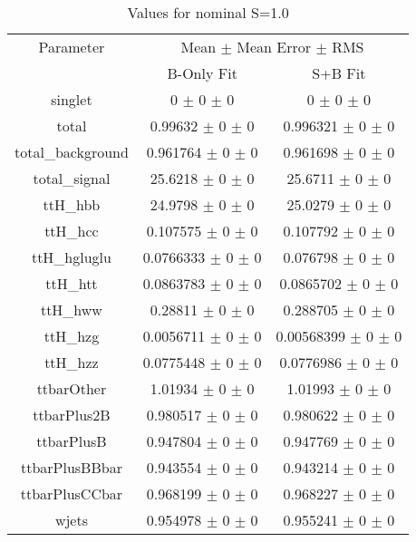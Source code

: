 \begin{table}
\centering
\caption{Values for nominal S=1.0}
\begin{tabular}{ccc}
\toprule
Parameter 	& \multicolumn{2}{c}{Mean $\pm$ Mean Error $\pm$ RMS}\\
 	& B-Only Fit & S+B Fit\\
\midrule
singlet 	& \num{0} $\pm$ \num{0} $\pm$ \num{0} 	& \num{0} $\pm$ \num{0} $\pm$ \num{0}\\
total 	& \num{0.99632} $\pm$ \num{0} $\pm$ \num{0} 	& \num{0.996321} $\pm$ \num{0} $\pm$ \num{0}\\
total\_background 	& \num{0.961764} $\pm$ \num{0} $\pm$ \num{0} 	& \num{0.961698} $\pm$ \num{0} $\pm$ \num{0}\\
total\_signal 	& \num{25.6218} $\pm$ \num{0} $\pm$ \num{0} 	& \num{25.6711} $\pm$ \num{0} $\pm$ \num{0}\\
ttH\_hbb 	& \num{24.9798} $\pm$ \num{0} $\pm$ \num{0} 	& \num{25.0279} $\pm$ \num{0} $\pm$ \num{0}\\
ttH\_hcc 	& \num{0.107575} $\pm$ \num{0} $\pm$ \num{0} 	& \num{0.107792} $\pm$ \num{0} $\pm$ \num{0}\\
ttH\_hgluglu 	& \num{0.0766333} $\pm$ \num{0} $\pm$ \num{0} 	& \num{0.076798} $\pm$ \num{0} $\pm$ \num{0}\\
ttH\_htt 	& \num{0.0863783} $\pm$ \num{0} $\pm$ \num{0} 	& \num{0.0865702} $\pm$ \num{0} $\pm$ \num{0}\\
ttH\_hww 	& \num{0.28811} $\pm$ \num{0} $\pm$ \num{0} 	& \num{0.288705} $\pm$ \num{0} $\pm$ \num{0}\\
ttH\_hzg 	& \num{0.0056711} $\pm$ \num{0} $\pm$ \num{0} 	& \num{0.00568399} $\pm$ \num{0} $\pm$ \num{0}\\
ttH\_hzz 	& \num{0.0775448} $\pm$ \num{0} $\pm$ \num{0} 	& \num{0.0776986} $\pm$ \num{0} $\pm$ \num{0}\\
ttbarOther 	& \num{1.01934} $\pm$ \num{0} $\pm$ \num{0} 	& \num{1.01993} $\pm$ \num{0} $\pm$ \num{0}\\
ttbarPlus2B 	& \num{0.980517} $\pm$ \num{0} $\pm$ \num{0} 	& \num{0.980622} $\pm$ \num{0} $\pm$ \num{0}\\
ttbarPlusB 	& \num{0.947804} $\pm$ \num{0} $\pm$ \num{0} 	& \num{0.947769} $\pm$ \num{0} $\pm$ \num{0}\\
ttbarPlusBBbar 	& \num{0.943554} $\pm$ \num{0} $\pm$ \num{0} 	& \num{0.943214} $\pm$ \num{0} $\pm$ \num{0}\\
ttbarPlusCCbar 	& \num{0.968199} $\pm$ \num{0} $\pm$ \num{0} 	& \num{0.968227} $\pm$ \num{0} $\pm$ \num{0}\\
wjets 	& \num{0.954978} $\pm$ \num{0} $\pm$ \num{0} 	& \num{0.955241} $\pm$ \num{0} $\pm$ \num{0}\\
\bottomrule
\end{tabular}
\end{table}